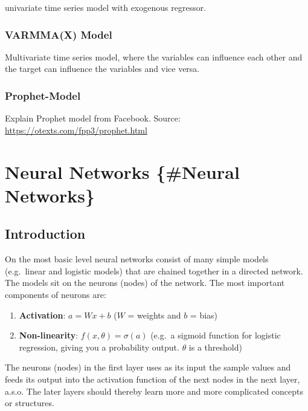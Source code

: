 \documentclass[
]{book}
\begin{document}
univariate time series model with exogenous regressor.

\hypertarget{varmmax-model}{%
\subsection{VARMMA(X) Model}\label{varmmax-model}}

Multivariate time series model, where the variables can influence each other and the target can influence the variables and vice versa.

\hypertarget{prophet-model}{%
\subsection{Prophet-Model}\label{prophet-model}}

Explain Prophet model from Facebook.
Source: \url{https://otexts.com/fpp3/prophet.html}

\hypertarget{neural-networks-neural-networks}{%
\chapter{Neural Networks \{\#Neural Networks\}}\label{neural-networks-neural-networks}}

\hypertarget{introduction}{%
\section{Introduction}\label{introduction}}

On the most basic level neural networks consist of many simple models
(e.g.~linear and logistic models) that are chained together in a
directed network. The models sit on the neurons (nodes) of the network.
The most important components of neurons are:

\begin{enumerate}
\def\labelenumi{\arabic{enumi}.}
\item
  \textbf{Activation}: \(a = Wx+b\) (\(W\) = weights and \(b\) = bias)
\item
  \textbf{Non-linearity}: \(f(x, \theta)=\sigma(a)\) (e.g.~a sigmoid function
  for logistic regression, giving you a probability output. \(\theta\)
  is a threshold)
\end{enumerate}

The neurons (nodes) in the first layer uses as its input the sample
values and feeds its output into the activation function of the next
nodes in the next layer, a.s.o. The later layers should thereby learn
more and more complicated concepts or structures.
\end{document}
